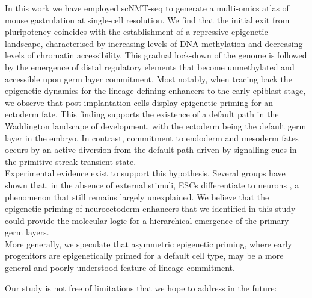 In this work we have employed scNMT-seq to generate a multi-omics atlas of mouse gastrulation at single-cell resolution. We find that the initial exit from pluripotency coincides with the establishment of a repressive epigenetic landscape, characterised by increasing levels of DNA methylation and decreasing levels of chromatin accessibility. This gradual lock-down of the genome is followed by the emergence of distal regulatory elements that become unmethylated and accessible upon germ layer commitment. Most notably, when tracing back the epigenetic dynamics for the lineage-defining enhancers to the early epiblast stage, we observe that post-implantation cells display epigenetic priming for an ectoderm fate. This finding supports the existence of a default path in the Waddington landscape of development, with the ectoderm being the default germ layer in the embryo. In contrast, commitment to endoderm and mesoderm fates occurs by an active diversion from the default path driven by signalling cues in the primitive streak transient state.\\
Experimental evidence exist to support this hypothesis. Several groups have shown that, in the absence of external stimuli, ESCs differentiate to neurons \cite{Munoz2002,Hemmati-Brivanlou1997}, a phenomenon that still remains largely unexplained. We believe that the epigenetic priming of neuroectoderm enhancers that we identified in this study could provide the molecular logic for a hierarchical emergence of the primary germ layers.\\
More generally, we speculate that asymmetric epigenetic priming, where early progenitors are epigenetically primed for a default cell type, may be a more general and poorly understood feature of lineage commitment. 

Our study is not free of limitations that we hope to address in the future:

